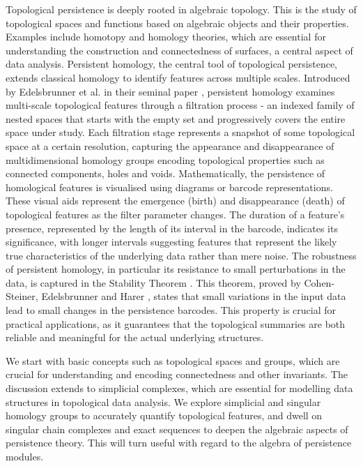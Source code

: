 \label{TopologicalSpaces}
Topological persistence is deeply rooted in algebraic topology. This is the study of topological spaces and functions based on algebraic objects and their properties. Examples include homotopy and homology theories, which are essential for understanding the construction and connectedness of surfaces, a central aspect of data analysis. Persistent homology, the central tool of topological persistence, extends classical homology to identify features across multiple scales. Introduced by Edelsbrunner et al. in their seminal paper \cite{edelsbrunner2000triangulations}, persistent homology examines multi-scale topological features through a filtration process - an indexed family of nested spaces that starts with the empty set and progressively covers the entire space under study. Each filtration stage represents a snapshot of some topological space at a certain resolution, capturing the appearance and disappearance of multidimensional homology groups encoding topological properties such as connected components, holes and voids. Mathematically, the persistence of homological features is visualised using diagrams or barcode representations.  These visual aids represent the emergence (birth) and disappearance (death) of topological features as the filter parameter changes. The duration of a feature's presence, represented by the length of its interval in the barcode, indicates its significance, with longer intervals suggesting features that represent the likely true characteristics of the underlying data rather than mere noise. The robustness of persistent homology, in particular its resistance to small perturbations in the data, is captured in the Stability Theorem \cite[\S 3.1]{Cohen-Steiner2007}. This theorem, proved by Cohen-Steiner, Edelsbrunner and Harer \cite[\S 3]{bendich2007inferring}, states that small variations in the input data lead to small changes in the persistence barcodes. This property is crucial for practical applications, as it guarantees that the topological summaries are both reliable and meaningful for the actual underlying structures.

We start with basic concepts such as topological spaces and groups, which are crucial for understanding and encoding connectedness and other invariants. The discussion extends to simplicial complexes, which are essential for modelling data structures in topological data analysis.  We explore simplicial and singular homology groups to accurately quantify topological features, and dwell on singular chain complexes and exact sequences to deepen the algebraic aspects of persistence theory. This will turn useful with regard to the algebra of persistence modules.

